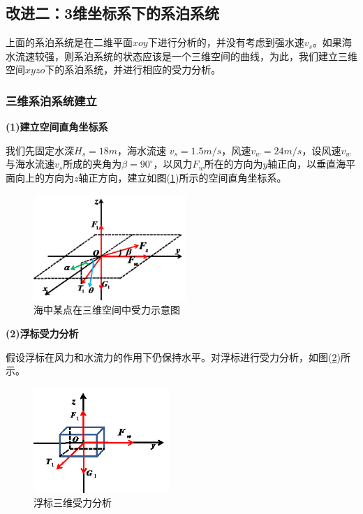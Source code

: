     \subsection{改进二：3维坐标系下的系泊系统}
        \par
        上面的系泊系统是在二维平面$xoy$下进行分析的，并没有考虑到强水速$v_s$。如果海水流速较强，则系泊系统的状态应该是一个三维空间的曲线，为此，我们建立三维空间$xyzo$下的系泊系统，并进行相应的受力分析。
        \subsubsection{三维系泊系统建立}
            \par
            \textbf{(1)建立空间直角坐标系}
            \par
            我们先固定水深$H_s=18m$，海水流速 $v_s=1.5m/s$，风速$v_w =24m/s$，设风速$v_w$与海水流速$v_s$所成的夹角为$\beta=90^\circ$，以风力$F_w$所在的方向为$y$轴正向，以垂直海平面向上的方向为$z$轴正方向，建立如图(\ref{海中某点在三维空间中受力示意图})所示的空间直角坐标系。
            \begin{figure}[H]
            \centering
            \includegraphics[height=4cm]{images/onepoint_force_analysis_in_sea.jpg}
            \caption{海中某点在三维空间中受力示意图}
            \label{海中某点在三维空间中受力示意图}
            \end{figure}
            \par
            \textbf{(2)浮标受力分析}
            \par
            假设浮标在风力和水流力的作用下仍保持水平。对浮标进行受力分析，如图(\ref{浮标三维受力分析})所示。
            \begin{figure}[H]
            \centering
            \includegraphics[height=4cm]{images/buoy_three_dimensions_force_analysis.jpg}
            \caption{浮标三维受力分析}
            \label{浮标三维受力分析}
            \end{figure}
